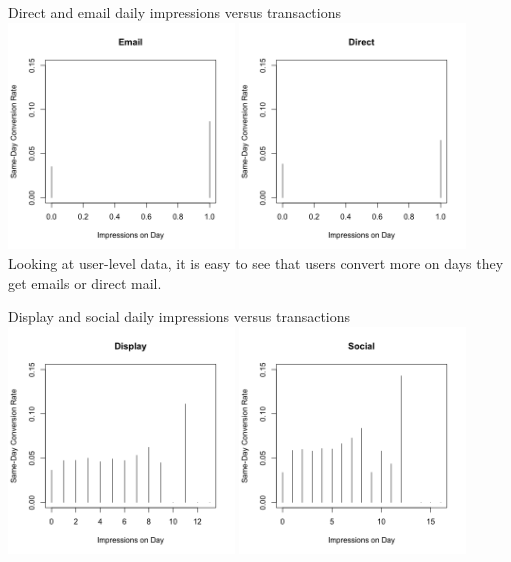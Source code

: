 \documentclass[10pt, aspectratio=169]{beamer}
\begin{document}
\begin{frame}{Direct and email daily impressions versus transactions}
\includegraphics[width=0.45\textwidth]{images/attribmodelemailvtrans.png}
\includegraphics[width=0.45\textwidth]{images/attribmodeldirectvtrans.png}\\
\alert{Looking at user-level data, it is easy to see that users convert more on days they get emails or direct mail.}
\end{frame}

\begin{frame}{Display and social daily impressions versus transactions}
\includegraphics[width=0.45\textwidth]{images/attribmodeldisplayvtrans.png}
\includegraphics[width=0.45\textwidth]{images/attribmodelsocialvtrans.png}
\end{frame}
\end{document}
